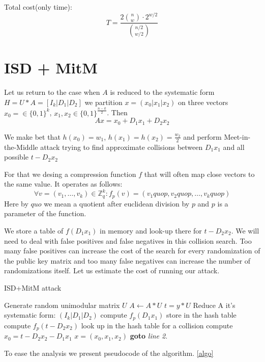 \documentclass[12pt]{article}
\newcommand{\ZZ}{\mathbb{Z}}
\begin{document}
Total cost(only time):
\[
  T = \frac{2\binom{n}{w} \cdot 2^{w/2}}{\binom{n/2}{w/2}}
\]
\section{ISD + MitM}
Let us return to the case when $A$ is reduced to the systematic form $H = U * A = [I_{k}| D_1 | D_2]$ we partition $x = (x_0 |x_1 |x_2)$ on three vectors $x_0 = \in \{0,1\}^{k}$, $x_1,x_2 \in \{0,1\}^{\frac{n-k}{2}}$. Then
\[
  Ax = x_0 + D_1x_1 + D_2x_2
\]

We make bet that $h(x_0) = w_1$, $h(x_1) = h(x_2) = \frac{w_2}{2}$ and perform Meet-in-the-Middle attack trying to find approximate collisions between $D_1x_1$ and all possible $t - D_2x_2$

For that we desing a compression function $f$ that will often map close vectors to the same value. It operates as follows:
\[
\forall v = (v_1, \dots , v_k)\in \ZZ_{q}^{k}: f_{p}(v) = (v_1 quo p, v_2 quo p, \dots, v_k quo p)
\]
Here by $quo$ we mean a quotient after euclidean division by $p$ and $p$ is a parameter of the function.

We store a table of $f(D_1x_1)$ in memory and look-up there for $t - D_2x_2$. We will need to deal with false positives and false negatives in this collision search. Too many false positives can increase the cost of the search for every randomization of the public key matrix and too many false negatives can increase the number of randomizations itself. Let us estimate the cost of running our attack.
\begin{algorithm}
\caption{ISD+MitM attack}\label{algo}
\begin{algorithmic}[1]
    \State Generate random unimodular matrix $U$
    \State $A \gets A * U$
    \State $t = y * U$
    \State Reduce A it's systematic form: $(I_k |D_1|D_2)$
    \State compute $f_{p}(D_1x_1)$
    \State store in the hash table
    \EndFor
    \State compute $f_{p}(t - D_2x_2)$
    \State look up in the hash table for a collision
        \State compute $x_0 = t - D_2x_2 - D_1x_1$
        \State \Return $x = (x_0, x_1, x_2)$
        \EndIf
    \EndIf
    \EndFor
\State \textbf{goto} \emph{line 2}.
\EndProcedure
\end{algorithmic}
\end{algorithm}
To ease the analysis we present pseudocode of the algorithm. \ref{algo}
\end{document}
